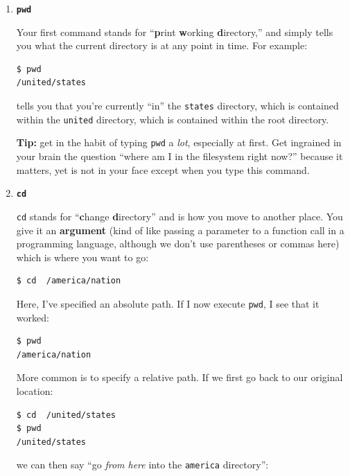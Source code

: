 \begin{enumerate}
\itemsep.1em
\item \textbf{\texttt{pwd}}

Your first command stands for ``\textbf{p}rint \textbf{w}orking
\textbf{d}irectory,'' and simply tells you what the current directory is at any
point in time. For example:

\begin{Verbatim}[fontsize=\small]
$ pwd
/united/states
\end{Verbatim}

tells you that you're currently ``in'' the \texttt{states} directory, which is
contained within the \texttt{united} directory, which is contained within the
root directory.

\textbf{Tip:} get in the habit of typing \texttt{pwd} a \textit{lot},
especially at first. Get ingrained in your brain the question ``where am I in
the filesystem right now?'' because it matters, yet is not in your face except
when you type this command.

\bigline
\item \textbf{\texttt{cd}}

\texttt{cd} stands for ``\textbf{c}hange \textbf{d}irectory'' and is how you
move to another place. You give it an \textbf{argument} (kind of like passing
a parameter to a function call in a programming language, although we don't
use parentheses or commas here) which is where you want to go:

\begin{Verbatim}[fontsize=\small]
$ cd  /america/nation
\end{Verbatim}

Here, I've specified an absolute path. If I now execute \texttt{pwd}, I see
that it worked:
\begin{Verbatim}[fontsize=\small]
$ pwd
/america/nation
\end{Verbatim}

More common is to specify a relative path. If we first go back to our original
location:

\begin{Verbatim}[fontsize=\small]
$ cd  /united/states
$ pwd
/united/states
\end{Verbatim}

we can then say ``go \textit{from here} into the \texttt{america} directory'':


\end{enumerate}
